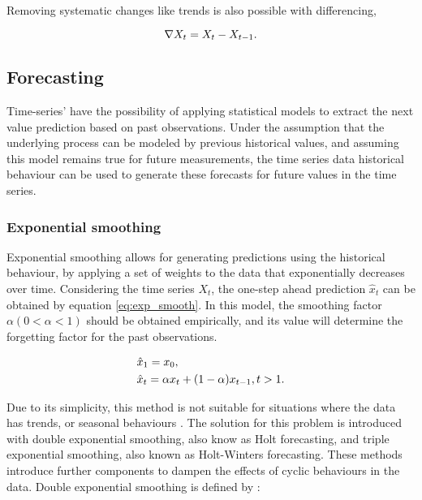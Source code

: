 Removing systematic changes like trends is also possible with differencing,

\begin {equation*}
\centering
\nabla X_t = X_t - X_{t-1}.
\end {equation*}

\subsection{Forecasting}

Time-series' have the possibility of applying statistical models to extract the next value prediction based on past observations. Under the assumption that the
underlying process can be modeled by previous historical values, and assuming this model remains true for future measurements, the time series data historical 
behaviour can be used to generate these forecasts for future values in the time series. 

\subsubsection{Exponential smoothing}

\par Exponential smoothing allows for generating predictions using the historical behaviour, by applying a set of weights to the data that exponentially decreases 
over time. Considering the time series $X_t$, the one-step ahead prediction $\hat{x}_t$ can be obtained by equation \ref{eq:exp_smooth}.  In this model, the 
smoothing factor $\alpha (0 < \alpha < 1)$ should be obtained empirically, and its value will determine the forgetting factor for the past observations.

\begin {equation*}
    \centering
        \begin {split}
            &\hat{x}_1 = x_0, \\
            &\hat{x}_t = \alpha x_{t} + (1-\alpha)x_{t-1}, t > 1.
        \end {split}
    \label{eq:exp_smooth}
\end {equation*}

\par Due to its simplicity, this method is not suitable for situations where the data has trends, or seasonal behaviours \cite{kalekar_time_2004}. The solution for
this problem is introduced with double exponential smoothing, also know as Holt forecasting, and triple exponential smoothing, also known as Holt-Winters
forecasting. These methods introduce further components to dampen the effects of cyclic behaviours in the data. Double exponential smoothing is defined by
\cite{munz_traffic_2010} :

